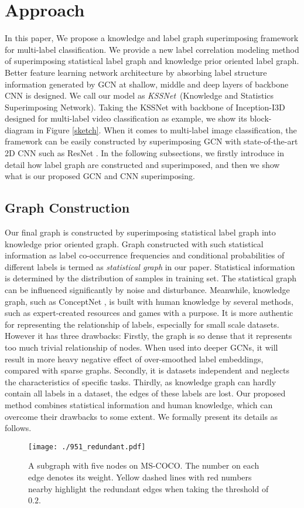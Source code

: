 \documentclass[letterpaper]{article} \usepackage{aaai20}  \usepackage{times}  \usepackage{helvet} \usepackage{courier}  \usepackage[hyphens]{url}  \usepackage{graphicx} \usepackage{subfigure}
\begin{document}
\section{Approach}
In this paper, We propose a knowledge and label graph superimposing framework for multi-label classification. We provide a new label correlation modeling method of superimposing statistical label graph and knowledge prior oriented label graph. Better feature learning network architecture by absorbing label structure information generated by GCN at shallow, middle and deep layers of backbone CNN is designed. We call our model as \emph{KSSNet}~(Knowledge and Statistics Superimposing Network). Taking the KSSNet with backbone of Inception-I3D \cite{carreira2017quo} designed for multi-label video classification as example, we show its block-diagram in Figure \ref{sketch}. When it comes to multi-label image classification, the framework can be easily constructed by superimposing GCN with state-of-the-art 2D CNN such as ResNet \cite{resnet}. 
In the following subsections, we firstly introduce in detail how label graph are constructed and superimposed, and then we show what is our proposed GCN and CNN superimposing.



\subsection{Graph Construction}
Our final graph is constructed by superimposing statistical label graph into knowledge prior oriented graph.
Graph constructed with such statistical information as label co-occurrence frequencies and conditional probabilities of different labels is termed as \emph{statistical graph} in our paper. Statistical information is determined by the distribution of samples in training set.  
The statistical graph can be influenced significantly by noise and disturbance. Meanwhile, knowledge graph, such as ConceptNet \cite{speer2017conceptnet}, is built with human knowledge by several methods, such as expert-created resources and games with a purpose. It is more authentic for representing the relationship of labels, especially for small scale datasets. However it has three drawbacks: Firstly, the graph is so dense that it represents too much trivial relationship of nodes. When used into deeper GCNs, it will result in more heavy negative effect of over-smoothed label embeddings, compared with sparse graphs. Secondly, it is datasets independent and neglects the characteristics of specific tasks. Thirdly, as knowledge graph can hardly contain all labels in a dataset, the edges of these labels are lost. Our proposed method combines statistical information and human knowledge, which can overcome their drawbacks to some extent. We formally present its details as follows.
\begin{figure}[!tb]
	\centering
	\texttt{[image: ./951\_redundant.pdf]}
	\caption{A subgraph with five nodes on MS-COCO.  The number on each edge denotes its weight. Yellow dashed lines with red numbers nearby highlight the redundant edges when taking the threshold of $0.2$.}
	\label{redundant}
  \end{figure}
\end{document}
